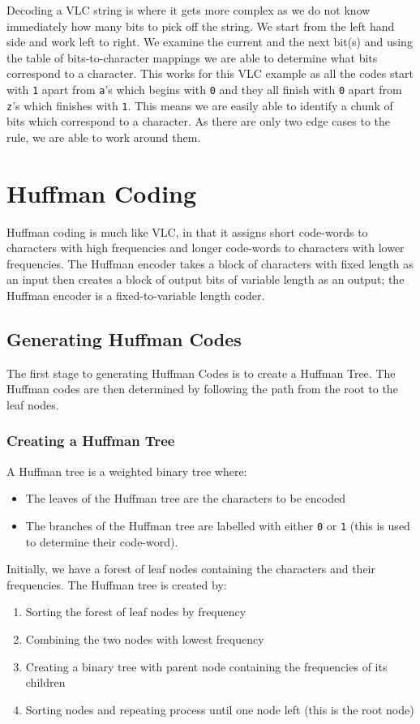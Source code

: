 Decoding a VLC string is where it gets more complex as we do not know immediately how many bits to pick off the string. We start from the left hand side and work left to right. We examine the current and the next bit(s) and using the table of bits-to-character mappings we are able to determine what bits correspond to a character. This works for this VLC example as all the codes start with \verb|1| apart from \verb|a|'s which begins with \verb|0| and they all finish with \verb|0| apart from \verb|z|'s which finishes with \verb|1|. This means we are easily able to identify a chunk of bits which correspond to a character. As there are only two edge cases to the rule, we are able to work around them. 

\section{Huffman Coding}
Huffman coding is much like VLC, in that it assigns short code-words to characters with high frequencies and longer code-words to characters with lower frequencies. The Huffman encoder takes a block of characters with fixed length as an input then creates a block of output bits of variable length as an output; the Huffman encoder is a fixed-to-variable length coder.

\subsection{Generating Huffman Codes}
The first stage to generating Huffman Codes is to create a Huffman Tree. The Huffman codes are then determined by following the path from the root to the leaf nodes.
\subsubsection{Creating a Huffman Tree}
A Huffman tree is a weighted binary tree where:
\begin{itemize}
    \item The leaves of the Huffman tree are the characters to be encoded
    \item The branches of the Huffman tree are labelled with either \verb|0| or \verb|1| (this is used to determine their code-word). 
\end{itemize}

Initially, we have a forest of leaf nodes containing the characters and their frequencies. The Huffman tree is created by:
\begin{enumerate}
    \item Sorting the forest of leaf nodes by frequency
    \item Combining the two nodes with lowest frequency
    \item Creating a binary tree with parent node containing the frequencies of its children
    \item Sorting nodes and repeating process until one node left (this is the root node)
\end{enumerate}

